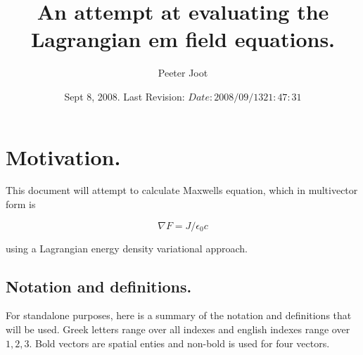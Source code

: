 \documentclass{article}
\title{ An attempt at evaluating the Lagrangian em field equations. }
\author{Peeter Joot}
\date{ Sept 8, 2008.  Last Revision: $Date: 2008/09/13 21:47:31 $ }
\newcommand{\grad}[0]{\nabla}
\begin{document}
\tableofcontents

\maketitle{}

\section{ Motivation. }

This document will attempt to calculate Maxwells equation, which in multivector form is

\begin{equation}
\grad F = J/\epsilon_0 c
\end{equation}

using a Lagrangian energy density variational approach.

\subsection{ Notation and definitions. }

For standalone purposes, here is a summary of the notation and definitions that will be used.  Greek letters range over all indexes and
english indexes range over $1,2,3$.  Bold vectors are spatial enties and non-bold is used for four vectors.
\end{document}
